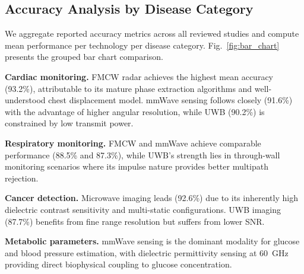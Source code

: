 \documentclass[journal,twoside]{IEEEtran}
\begin{document}
\subsection{Accuracy Analysis by Disease Category}

We aggregate reported accuracy metrics across all reviewed studies and compute mean performance per technology per disease category. Fig.~\ref{fig:bar_chart} presents the grouped bar chart comparison.

\textbf{Cardiac monitoring.} FMCW radar achieves the highest mean accuracy (93.2\%), attributable to its mature phase extraction algorithms and well-understood chest displacement model. mmWave sensing follows closely (91.6\%) with the advantage of higher angular resolution, while UWB (90.2\%) is constrained by low transmit power.

\textbf{Respiratory monitoring.} FMCW and mmWave achieve comparable performance (88.5\% and 87.3\%), while UWB's strength lies in through-wall monitoring scenarios where its impulse nature provides better multipath rejection.

\textbf{Cancer detection.} Microwave imaging leads (92.6\%) due to its inherently high dielectric contrast sensitivity and multi-static configurations. UWB imaging (87.7\%) benefits from fine range resolution but suffers from lower SNR.

\textbf{Metabolic parameters.} mmWave sensing is the dominant modality for glucose and blood pressure estimation, with dielectric permittivity sensing at 60~GHz providing direct biophysical coupling to glucose concentration.
\end{document}
